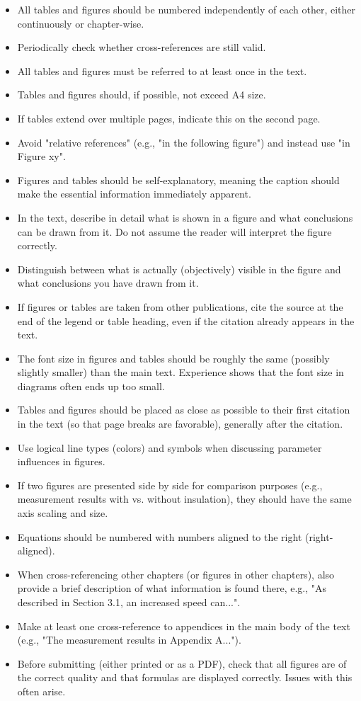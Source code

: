 \begin{itemize}
    \item All tables and figures should be numbered independently of each other, either continuously or chapter-wise.
    \item Periodically check whether cross-references are still valid.
    \item All tables and figures must be referred to at least once in the text.
    \item Tables and figures should, if possible, not exceed A4 size.
    \item If tables extend over multiple pages, indicate this on the second page.
    \item Avoid "relative references" (e.g., "in the following figure") and instead use "in Figure xy".
    \item Figures and tables should be self-explanatory, meaning the caption should make the essential information immediately apparent.
    \item In the text, describe in detail what is shown in a figure and what conclusions can be drawn from it. Do not assume the reader will interpret the figure correctly.
    \item Distinguish between what is actually (objectively) visible in the figure and what conclusions you have drawn from it.
    \item If figures or tables are taken from other publications, cite the source at the end of the legend or table heading, even if the citation already appears in the text.
    \item The font size in figures and tables should be roughly the same (possibly slightly smaller) than the main text. Experience shows that the font size in diagrams often ends up too small.
    \item Tables and figures should be placed as close as possible to their first citation in the text (so that page breaks are favorable), generally after the citation.
    \item Use logical line types (colors) and symbols when discussing parameter influences in figures.
    \item If two figures are presented side by side for comparison purposes (e.g., measurement results with vs. without insulation), they should have the same axis scaling and size.
    \item Equations should be numbered with numbers aligned to the right (right-aligned).
    \item When cross-referencing other chapters (or figures in other chapters), also provide a brief description of what information is found there, e.g., "As described in Section 3.1, an increased speed can...".
    \item Make at least one cross-reference to appendices in the main body of the text (e.g., "The measurement results in Appendix A...").
    \item Before submitting (either printed or as a PDF), check that all figures are of the correct quality and that formulas are displayed correctly. Issues with this often arise.
\end{itemize}


